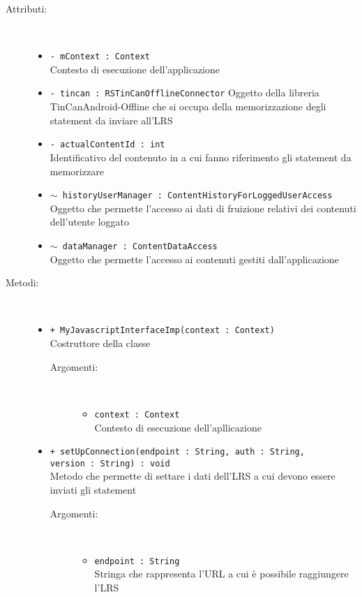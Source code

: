 \documentclass[../Tesi.tex]{subfiles}
\begin{document}
		\begin{description}
			\item[Attributi:] \
			\begin{itemize}
				\item \texttt{- mContext : Context}\\
				Contesto di esecuzione dell'applicazione

				\item \texttt{- tincan : RSTinCanOfflineConnector}
				Oggetto della libreria TinCanAndroid-Offline che si occupa della memorizzazione degli statement da inviare all'LRS

				\item \texttt{- actualContentId : int}\\
				Identificativo del contenuto in a cui fanno riferimento gli statement da memorizzare

				\item \texttt{$\sim$ historyUserManager : ContentHistoryForLoggedUserAccess}\\
				Oggetto che permette l'accesso ai dati di fruizione relativi dei contenuti dell'utente loggato

				\item \texttt{$\sim$ dataManager : ContentDataAccess}\\
				Oggetto che permette l'accesso ai contenuti gestiti dall'applicazione
			\end{itemize}

			\item[Metodi:] \
			\begin{itemize}
				\item \texttt{+ MyJavascriptInterfaceImp(context : Context)}\\
				Costruttore della classe 
				\begin{description}
					\item[Argomenti:] \
					\begin{itemize}
						\item \texttt{context : Context}\\
						Contesto di esecuzione dell'apllicazione
					\end{itemize}
				\end{description}

				\item \texttt{+ setUpConnection(endpoint : String, auth : String, \\version : String) : void}\\
				Metodo che permette di settare i dati dell'LRS a cui devono essere inviati gli statement
				\begin{description}
					\item[Argomenti:] \
					\begin{itemize}
						\item \texttt{endpoint : String}\\
						Stringa che rappresenta l'URL a cui è possibile raggiungere l'LRS


\end{itemize}
\end{description}
\end{itemize}
\end{description}
\end{document}
